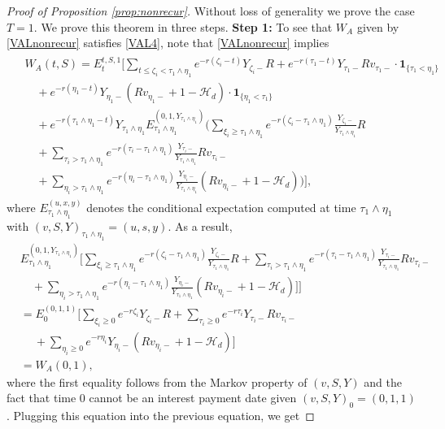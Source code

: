 \documentclass[draft, noinfoline]{ectaart}
\numberwithin{equation}{section}
\theoremstyle{plain}
\begin{document}
\begin{appendices}
\begin{proof}[Proof of Proposition \ref{prop:nonrecur}]
	Without loss of generality we prove the case $T=1$. We prove this theorem in three steps.
	{\flushleft\bf Step 1:}
	To see that $W_A$ given by \eqref{VALnonrecur} satisfies \eqref{VAL4}, note that \eqref{VALnonrecur} implies
	\begin{align*}
	\begin{split}
	&W_A(t,S)=E_t^{t,S,1}\Bigg[\sum_{t\le\zeta_i<\tau_1\land\eta_1}e^{-r(\zeta_i-t)}Y_{\zeta_i-}R+e^{-r(\tau_1-t)}Y_{\tau_1-}Rv_{\tau_1-}\cdot\mathbf{1}_{\{\tau_1<\eta_1\}}\\
	&\quad+e^{-r(\eta_1-t)}Y_{\eta_1-}(Rv_{\eta_1-}+1-\mathcal{H}_d)\cdot\mathbf{1}_{\{\eta_1<\tau_1\}}\\
	&\quad+e^{-r(\tau_1\land\eta_1-t)}Y_{\tau_1\land\eta_1}E_{\tau_1\land\eta_1}^{(0,1,Y_{\tau_1\land\eta_1})}\Bigg(\sum_{\xi_i\ge\tau_1\land\eta_1}e^{-r(\zeta_i-\tau_1\land\eta_1)}\frac{Y_{\zeta_i-}}{Y_{\tau_1\land\eta_1}}R\\
	&\quad+\sum_{\tau_i>\tau_1\land\eta_1}e^{-r(\tau_i-\tau_1\land\eta_1)}\frac{Y_{\tau_i-}}{Y_{\tau_1\land\eta_1}}Rv_{\tau_i-}\\
	&\quad+\sum_{\eta_i>\tau_1\land\eta_1}e^{-r(\eta_i-\tau_1\land\eta_1)}\frac{Y_{\eta_i-}}{Y_{\tau_1\land\eta_1}}(Rv_{\eta_i-}+1-\mathcal{H}_d)\Bigg)\Bigg],
	\end{split}
	\end{align*}
	where $E_{\tau_1\land\eta_1}^{(u,x,y)}$ denotes the conditional expectation computed at time $\tau_1\land\eta_1$ with $(v,S,Y)_{\tau_1\land\eta_1}=(u,s,y)$. As a result,
	\begin{align*}
	 &E_{\tau_1\land\eta_1}^{(0,1,Y_{\tau_1\land\eta_1})}\Bigg[\sum_{\xi_i\ge\tau_1\land\eta_1}e^{-r(\zeta_i-\tau_1\land\eta_1)}\frac{Y_{\zeta_i-}}{Y_{\tau_1\land\eta_1}}R+\sum_{\tau_i>\tau_1\land\eta_1}e^{-r(\tau_i-\tau_1\land\eta_1)}\frac{Y_{\tau_i-}}{Y_{\tau_1\land\eta_1}}Rv_{\tau_i-}\\
	&\quad+\sum_{\eta_i>\tau_1\land\eta_1}e^{-r(\eta_i-\tau_1\land\eta_1)}\frac{Y_{\eta_i-}}{Y_{\tau_1\land\eta_1}}(Rv_{\eta_i-}+1-\mathcal{H}_d)\Bigg]\Bigg]\\
	&=E_{0}^{(0,1,1)}\Bigg[\sum_{\xi_i\ge0}e^{-r\zeta_i}Y_{\zeta_i-}R+\sum_{\tau_i\ge0}e^{-r\tau_i}Y_{\tau_i-}Rv_{\tau_i-} \\
	&~ \quad +\sum_{\eta_i\ge0}e^{-r\eta_i}Y_{\eta_i-}(Rv_{\eta_i-}+1-\mathcal{H}_d)\Bigg]\\
	&=W_A(0,1),
	\end{align*}
	where the first equality follows from the Markov property of $(v,S,Y)$ and the fact that time 0 cannot be an interest payment date given $(v,S,Y)_0=(0,1,1)$. Plugging this equation into the previous equation, we get

\end{proof}
\end{appendices}
\end{document}
